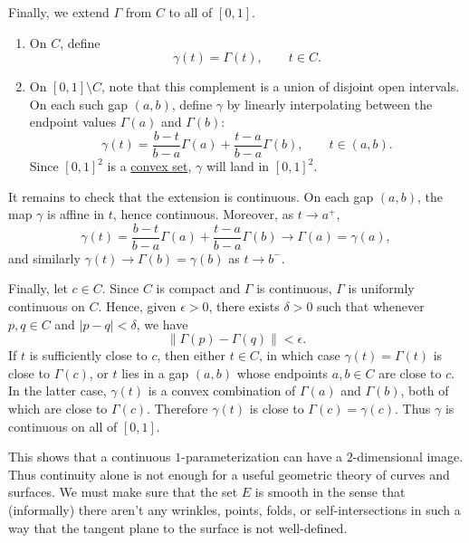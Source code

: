 \begin{example}
		Finally, we extend $\Gamma$ from $C$ to all of $[0,1]$. 
		\begin{enumerate}
		  \item On $C$, define
				\begin{equation}
					\gamma(t) = \Gamma(t), \qquad t \in C.
				\end{equation}
			
			\item On $[0, 1] \setminus C$, note that this complement is a union of disjoint open intervals. On each such gap $(a,b)$, define $\gamma$ by linearly interpolating between the endpoint values $\Gamma(a)$ and $\Gamma(b)$:
				\begin{equation}
					\gamma(t) = \frac{b-t}{b-a}\Gamma(a) + \frac{t-a}{b-a}\Gamma(b), \qquad t \in (a,b).
				\end{equation}
				Since $[0, 1]^2$ is a \hyperref[def:convex-set]{convex set}, $\gamma$ will land in $[0, 1]^2$. 
		\end{enumerate}
			
		It remains to check that the extension is continuous. On each gap $(a,b)$, the map $\gamma$ is affine in $t$, hence continuous. Moreover, as $t \to a^+$,
		\begin{equation}
			\gamma(t) = \frac{b-t}{b-a}\Gamma(a) + \frac{t-a}{b-a}\Gamma(b) \to \Gamma(a) = \gamma(a),
		\end{equation}
		and similarly $\gamma(t)\to \Gamma(b)=\gamma(b)$ as $t\to b^-$.
			
		Finally, let $c\in C$. Since $C$ is compact and $\Gamma$ is continuous, $\Gamma$ is uniformly continuous on $C$. Hence, given $\epsilon>0$, there exists $\delta>0$ such that whenever $p,q\in C$ and $|p-q|<\delta$, we have
		\begin{equation}
			\|\Gamma(p)-\Gamma(q)\|<\epsilon.
		\end{equation}
		If $t$ is sufficiently close to $c$, then either $t\in C$, in which case $\gamma(t)=\Gamma(t)$ is close to $\Gamma(c)$, or $t$ lies in a gap $(a,b)$ whose endpoints $a,b\in C$ are close to $c$. In the latter case, $\gamma(t)$ is a convex combination of $\Gamma(a)$ and $\Gamma(b)$, both of which are close to $\Gamma(c)$. Therefore $\gamma(t)$ is close to $\Gamma(c)=\gamma(c)$. Thus $\gamma$ is continuous on all of $[0,1]$.
	\end{example}
			
	This shows that a continuous $1$-parameterization can have a $2$-dimensional image. Thus continuity alone is not enough for a useful geometric theory of curves and surfaces. We must make sure that the set $E$ is smooth in the sense that (informally) there aren't any wrinkles, points, folds, or self-intersections in such a way that the tangent plane to the surface is not well-defined. 
			
